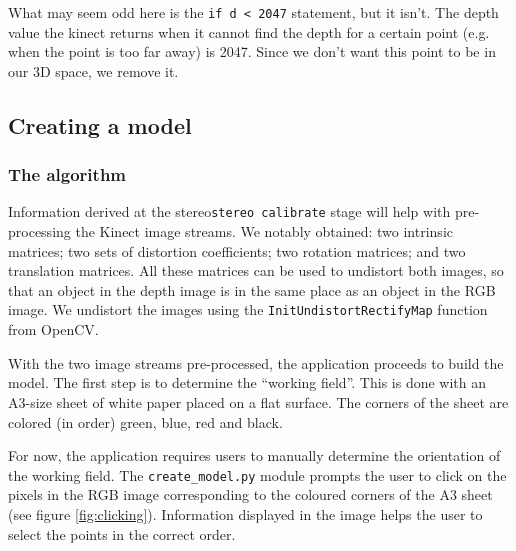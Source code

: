 What may seem odd here is the \verb|if d < 2047| statement, but it isn't. The depth value the kinect returns when it cannot find the depth for a certain point (e.g. when the point is too far away) is 2047. Since we don't want this point to be in our 3D space, we remove it.

\subsection{Creating a model}

\subsubsection{The algorithm}


Information derived at the stereo\texttt{stereo calibrate} stage will help with
pre-processing the Kinect image streams. We notably obtained: two intrinsic
matrices; two sets of distortion coefficients; two rotation matrices; and two
translation matrices. All these matrices can be used to undistort both images,
so that an object in the depth image is in the same place as an object in the
RGB image. We undistort the images using the \texttt{InitUndistortRectifyMap}
function from OpenCV.

With the two image streams pre-processed, the application proceeds to build the
model. The first step is to determine the ``working field''. This is done with
an A3-size sheet of white paper placed on a flat surface. The corners of the
sheet are colored (in order) green, blue, red and black.

For now, the application requires users to manually determine the orientation of
the working field. The \texttt{create\_model.py} module prompts the user to
click on the pixels in the RGB image corresponding to the coloured corners of
the A3 sheet (see figure \ref{fig:clicking}). Information displayed in the image helps the user to select the points in the correct order.

